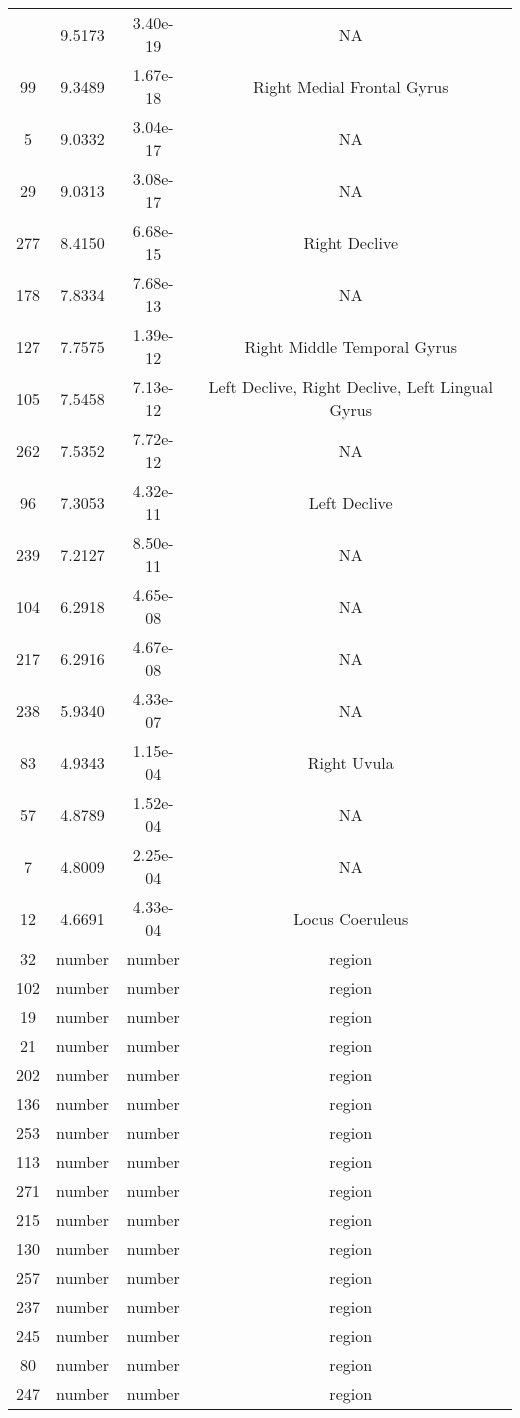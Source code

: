 \documentclass[12pt]{article}\usepackage[]{graphicx}\usepackage[]{color}
\begin{document}
\begin{longtable}[c]{cccc}
    \bottomrule
    \endlastfoot
	243 & 9.5173 & 3.40e-19 & NA \\
	99 & 9.3489 & 1.67e-18 & Right Medial Frontal Gyrus \\
	5 & 9.0332 & 3.04e-17 & NA \\
	29 & 9.0313 & 3.08e-17 & NA \\
	277 & 8.4150 & 6.68e-15 & Right Declive \\
	178 & 7.8334 & 7.68e-13 & NA\\
	127 & 7.7575 & 1.39e-12 & Right Middle Temporal Gyrus\\
	105 & 7.5458 & 7.13e-12 & Left Declive, Right Declive, Left Lingual Gyrus\\
	262 & 7.5352 & 7.72e-12 & NA \\
	96 & 7.3053 & 4.32e-11 & Left Declive \\
	239 & 7.2127 & 8.50e-11 & NA \\
	104 & 6.2918 & 4.65e-08 & NA \\
	217 & 6.2916 & 4.67e-08 & NA \\
	238 & 5.9340 & 4.33e-07 & NA \\
	83 & 4.9343 & 1.15e-04 & Right Uvula\\
	57 & 4.8789 & 1.52e-04 & NA \\
	7 & 4.8009 & 2.25e-04 & NA \\
	12 & 4.6691 & 4.33e-04 & Locus Coeruleus \\
	32 & number & number & region \\
	102 & number & number & region \\
	19 & number & number & region \\
	21 & number & number & region \\
	202 & number & number & region \\
	136 & number & number & region \\
	253 & number & number & region \\
	113 & number & number & region \\
	271 & number & number & region \\
	215 & number & number & region \\
	130 & number & number & region \\
	257 & number & number & region \\
	237 & number & number & region \\
	245 & number & number & region \\
	80 & number & number & region \\
	247 & number & number & region \\

\end{longtable}
\end{document}
